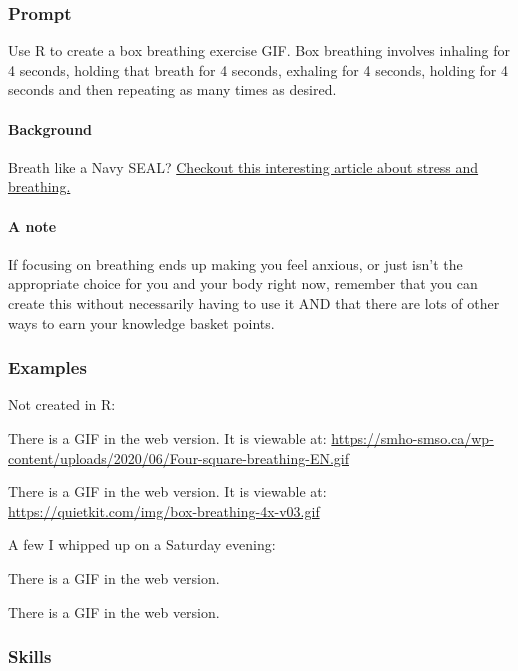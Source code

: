 \documentclass[
  openany]{book}
\begin{document}
\hypertarget{prompt-3}{%
\subsubsection{Prompt}\label{prompt-3}}

Use R to create a box breathing exercise GIF. Box breathing involves inhaling for 4 seconds, holding that breath for 4 seconds, exhaling for 4 seconds, holding for 4 seconds and then repeating as many times as desired.

\hypertarget{background}{%
\paragraph{Background}\label{background}}

Breath like a Navy SEAL? \href{https://www.forbes.com/sites/nomanazish/2019/05/30/how-to-de-stress-in-5-minutes-or-less-according-to-a-navy-seal/?sh=7b2aad83046d}{Checkout this interesting article about stress and breathing.}

\hypertarget{a-note}{%
\paragraph{A note}\label{a-note}}

If focusing on breathing ends up making you feel anxious, or just isn't the appropriate choice for you and your body right now, remember that you can create this without necessarily having to use it AND that there are lots of other ways to earn your knowledge basket points.

\hypertarget{examples-7}{%
\subsubsection{Examples}\label{examples-7}}

Not created in R:

There is a GIF in the web version. It is viewable at: \url{https://smho-smso.ca/wp-content/uploads/2020/06/Four-square-breathing-EN.gif}

There is a GIF in the web version. It is viewable at: \url{https://quietkit.com/img/box-breathing-4x-v03.gif}

A few I whipped up on a Saturday evening:

There is a GIF in the web version.

There is a GIF in the web version.

\hypertarget{skills-1}{%
\subsubsection{Skills}\label{skills-1}}
\end{document}
